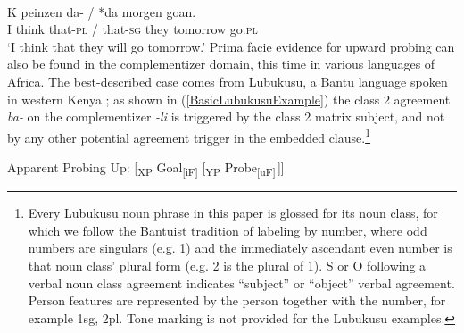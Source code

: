 \documentclass[output=paper
,modfonts
,nonflat
]{langsci/langscibook}
\begin{document}
\ea \label{WestFlemFirstExample}
 \\
\gll K peinzen 	da- /   *da        	 	morgen 	goan. \\
I think that-\textsc{pl} / that-\textsc{sg} they tomorrow go.\textsc{pl} \\
\glt `I think that they will go tomorrow.' 	
\z						
\noindent Prima facie evidence for upward probing can also be found in the complementizer domain, this time in various languages of Africa. The best-described case comes from Lubukusu, a Bantu language spoken in western Kenya \citep{Diercks:2010,Diercks:2013,Wasike:2007}; as shown in (\ref{BasicLubukusuExample}) the class 2 agreement \textit{ba-} on the complementizer \textit{-li} is triggered by the class 2 matrix subject, and not by any other potential agreement trigger in the embedded clause.\footnote{
	Every Lubukusu noun phrase in this paper is glossed for its noun class, for which we follow the Bantuist tradition of labeling by number, where odd numbers are singulars (e.g. 1) and the immediately ascendant even number is that noun class’ plural form (e.g. 2 is the plural of 1).  S or O following a verbal noun class agreement indicates ``subject'' or ``object'' verbal agreement.  Person features are represented by the person together with the number, for example 1sg, 2pl. Tone marking is not provided for the Lubukusu examples.}

\ea \label{ProbingUpSchematic}
Apparent Probing Up: [\textsubscript{XP} Goal\textsubscript{[iF]} [\textsubscript{YP} Probe\textsubscript{[uF]}\,]]
\z
\end{document}
